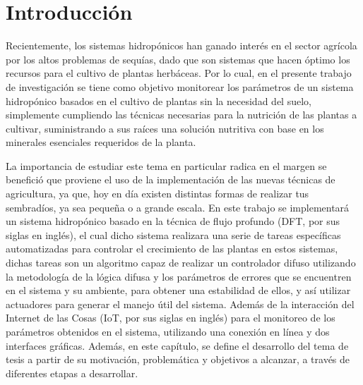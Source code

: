 \chapter{Introducción}       \label{chap:introduction}
Recientemente, los sistemas hidropónicos han ganado interés en el sector agrícola por los altos problemas de sequías, dado que son sistemas que hacen óptimo los recursos para el cultivo de plantas herbáceas. Por lo cual, en el presente trabajo de investigación se tiene como objetivo monitorear los parámetros de un sistema hidropónico basados en el cultivo de plantas sin la necesidad del suelo, simplemente cumpliendo las técnicas necesarias para la nutrición de las plantas a cultivar, suministrando a sus raíces una solución nutritiva con base en los minerales esenciales requeridos de la planta.

La importancia de estudiar este tema en particular radica en el margen se benefició que proviene el uso de la implementación de las nuevas técnicas de agricultura, ya que, hoy en día existen distintas formas de realizar tus sembradíos, ya sea pequeña o a grande escala. En este trabajo se implementará un sistema hidropónico basado en la técnica de flujo profundo (DFT, por sus siglas en inglés), el cual dicho sistema realizara una serie de tareas específicas automatizadas para controlar el crecimiento de las plantas en estos sistemas, dichas tareas son un algoritmo capaz de realizar un controlador difuso utilizando la metodología de la lógica difusa y los parámetros de errores que se encuentren en el sistema y su ambiente, para obtener una estabilidad de ellos, y así utilizar actuadores para generar el manejo útil del sistema. Además de la interacción del Internet de las Cosas (IoT, por sus siglas en inglés) para el monitoreo de los parámetros obtenidos en el sistema, utilizando una conexión en línea y dos interfaces gráficas. Además, en este capítulo, se define el desarrollo del tema de tesis a partir de su motivación, problemática y objetivos a alcanzar, a través de diferentes etapas a desarrollar.


